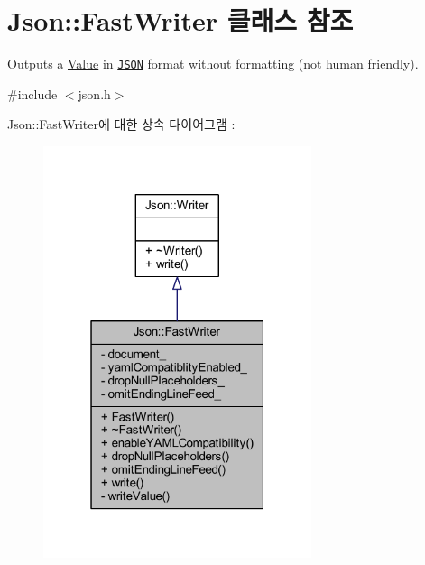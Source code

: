\hypertarget{class_json_1_1_fast_writer}{}\section{Json\+:\+:Fast\+Writer 클래스 참조}
\label{class_json_1_1_fast_writer}


Outputs a \hyperlink{class_json_1_1_value}{Value} in \href{http://www.json.org}{\tt J\+S\+ON} format without formatting (not human friendly).  




{\ttfamily \#include $<$json.\+h$>$}



Json\+:\+:Fast\+Writer에 대한 상속 다이어그램 \+: \nopagebreak
\begin{figure}[H]
\begin{center}
\leavevmode
\includegraphics[width=223pt]{class_json_1_1_fast_writer__inherit__graph}
\end{center}
\end{figure}



